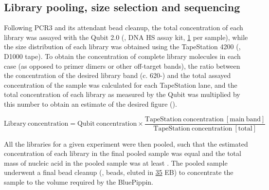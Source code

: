 

\subsection{Library pooling, size selection and sequencing} 
\label{sec:methods_molec_igseq_seq}

Following PCR3 and its attendant bead cleanup, the total concentration of each library was assayed with the Qubit 2.0 (, DNA HS assay kit, \ul{1} per sample), while the size distribution of each library was obtained using the TapeStation 4200 (, D1000 tape). To obtain the concentration of complete library molecules in each case (as opposed to primer dimers or other off-target bands), the ratio between the concentration of the desired library band (c. 620-) and the total assayed concentration of the sample was calculated for each TapeStation lane, and the total concentration of each library as measured by the Qubit was multiplied by this number to obtain an estimate of the desired figure ().

\begin{equation}
\mathrm{Library~concentration} = \mathrm{Qubit~concentration} \times \frac{\mathrm{TapeStation~concentration~[main~band]}}{\mathrm{TapeStation~concentration~[total]}}
\label{eq:library-conc}
\end{equation}

All the libraries for a given experiment were then pooled, such that the estimated concentration of each library in the final pooled sample was equal and the total mass of nucleic acid in the pooled sample was at least . The pooled sample underwent a final bead cleanup (,  beads, eluted in \ul{35} EB) to concentrate the sample to the volume required by the BluePippin.

